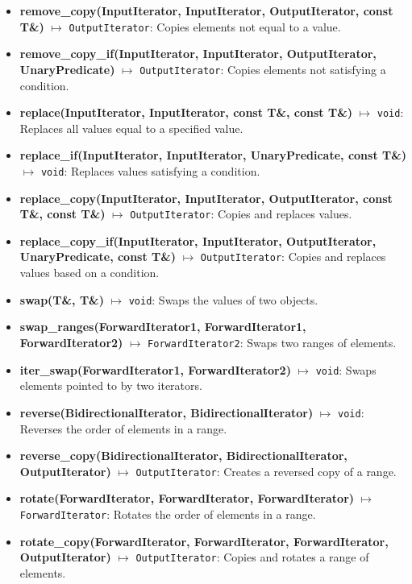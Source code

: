 \documentclass{report}
\begin{document}
\begin{itemize}
        \item \textbf{remove\_copy(InputIterator, InputIterator, OutputIterator, const T\&)} \(\mapsto\) \texttt{OutputIterator}: Copies elements not equal to a value.
        \item \textbf{remove\_copy\_if(InputIterator, InputIterator, OutputIterator, UnaryPredicate)} \(\mapsto\) \texttt{OutputIterator}: Copies elements not satisfying a condition.
        \item \textbf{replace(InputIterator, InputIterator, const T\&, const T\&)} \(\mapsto\) \texttt{void}: Replaces all values equal to a specified value.
        \item \textbf{replace\_if(InputIterator, InputIterator, UnaryPredicate, const T\&)} \(\mapsto\) \texttt{void}: Replaces values satisfying a condition.
        \item \textbf{replace\_copy(InputIterator, InputIterator, OutputIterator, const T\&, const T\&)} \(\mapsto\) \texttt{OutputIterator}: Copies and replaces values.
        \item \textbf{replace\_copy\_if(InputIterator, InputIterator, OutputIterator, UnaryPredicate, const T\&)} \(\mapsto\) \texttt{OutputIterator}: Copies and replaces values based on a condition.
        \item \textbf{swap(T\&, T\&)} \(\mapsto\) \texttt{void}: Swaps the values of two objects.
        \item \textbf{swap\_ranges(ForwardIterator1, ForwardIterator1, ForwardIterator2)} \(\mapsto\) \texttt{ForwardIterator2}: Swaps two ranges of elements.
        \item \textbf{iter\_swap(ForwardIterator1, ForwardIterator2)} \(\mapsto\) \texttt{void}: Swaps elements pointed to by two iterators.
        \item \textbf{reverse(BidirectionalIterator, BidirectionalIterator)} \(\mapsto\) \texttt{void}: Reverses the order of elements in a range.
        \item \textbf{reverse\_copy(BidirectionalIterator, BidirectionalIterator, OutputIterator)} \(\mapsto\) \texttt{OutputIterator}: Creates a reversed copy of a range.
        \item \textbf{rotate(ForwardIterator, ForwardIterator, ForwardIterator)} \(\mapsto\) \texttt{ForwardIterator}: Rotates the order of elements in a range.
        \item \textbf{rotate\_copy(ForwardIterator, ForwardIterator, ForwardIterator, OutputIterator)} \(\mapsto\) \texttt{OutputIterator}: Copies and rotates a range of elements.

\end{itemize}
\end{document}
